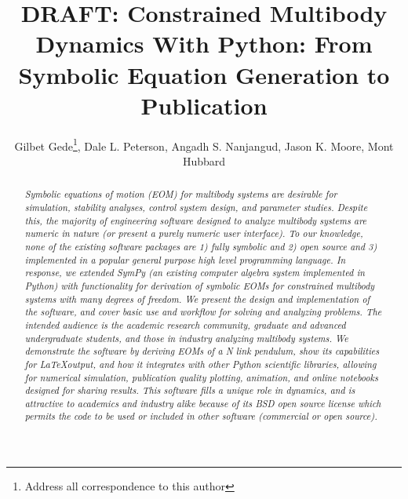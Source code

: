 \documentclass[twocolumn,10pt]{asme2e}
\title{DRAFT: Constrained Multibody Dynamics With Python: From Symbolic
Equation Generation to Publication}
\author{Gilbet Gede\thanks{Address all correspondence to this author}, Dale L.
Peterson, Angadh S. Nanjangud, Jason K. Moore, Mont Hubbard
  \affiliation{
    Sports Biomechanics Laboratory\\
    Department of Mechanical and Aerospace Engineering\\
    University of California\\
    Davis, California 95616\\
    Email: \{ggede, dlpeterson, asnanjangud, jkmoor, mhubbard\}@ucdavis.edu
  }
}
\begin{document}
\maketitle

\begin{abstract}
{\it Symbolic equations of motion (EOM) for multibody systems are desirable for
simulation, stability analyses, control system design, and parameter studies.
Despite this, the majority of engineering software designed to analyze
multibody systems are numeric in nature (or present a purely numeric user
interface). To our knowledge, none of the existing software packages are 1) fully
symbolic and 2) open source and 3) implemented in a popular general purpose
high level programming language.
In response, we extended SymPy (an existing computer algebra system implemented
in Python) with functionality for derivation of symbolic EOMs for constrained
multibody systems with many degrees of freedom.
We present the design and implementation of the software, and cover basic use
and workflow for solving and analyzing problems. The intended audience is the
academic research community, graduate and advanced undergraduate students, and
those in industry analyzing multibody systems.
We demonstrate the software by deriving EOMs of a N link pendulum, show its
capabilities for \LaTeX output, and how it integrates with other Python
scientific libraries, allowing for numerical simulation, publication quality
plotting, animation, and online notebooks designed for sharing results.
This software fills a unique role in dynamics, and is attractive to academics
and industry alike because of its BSD open source license which permits the
code to be used or included in other software (commercial or open source).}
\end{abstract}

\end{document}
